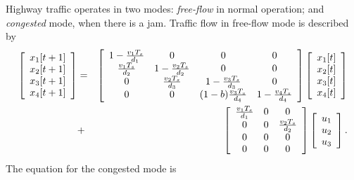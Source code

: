 \documentclass[letterpaper,10pt,english]{sphinxmanual}
\begin{document}
Highway traffic operates in two modes: \emph{free-flow} in normal operation;
and \emph{congested} mode, when there is a jam. Traffic flow in free-flow
mode is described by
\begin{gather}
\begin{split}\begin{aligned}
\left[\begin{array}{c}
x_1[t+1]\\
x_2[t+1]\\
x_3[t+1]\\
x_4[t+1]\end{array}\right] & = & \left[\begin{array}{cccc}
1-\frac{v_1T_s}{d_1} & 0 & 0 & 0\\
\frac{v_1T_s}{d_2} & 1-\frac{v_2T_s}{d_2} & 0 & 0\\
0 & \frac{v_2T_s}{d_3} & 1-\frac{v_3T_s}{d_3} & 0\\
0 & 0 & (1-b)\frac{v_3T_s}{d_4} & 1-\frac{v_4T_s}{d_4}\end{array}\right]
\left[\begin{array}{c}
x_1[t]\\
x_2[t]\\
x_3[t]\\
x_4[t]\end{array}\right] \nonumber\\
& + & \left[\begin{array}{ccc}
\frac{v_1T_s}{d_1} & 0 & 0\\
0 & 0 & \frac{v_2T_s}{d_2}\\
0 & 0 & 0\\
0 & 0 & 0\end{array}\right]\left[\begin{array}{c}
u_1\\
u_2\\
u_3\end{array}\right]. \label{fflow}\end{aligned}\end{split}\notag
\end{gather}
The equation for the congested mode is
\end{document}
